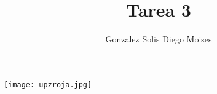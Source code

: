 \documentclass[12pt,a4paper]{article}
\author{Gonzalez Solis Diego Moises}
\title{Tarea 3}
\begin{document}
\maketitle
\texttt{[image: upzroja.jpg]} 
\newpage

\end{document}
